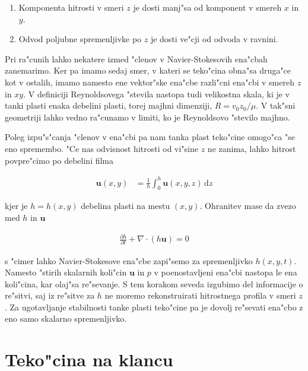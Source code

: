 \documentclass[a4paper,12pt]{article}
\renewcommand{\vec}{\mathbf}
\newcommand{\dd}{\,\mathrm{d}}
\begin{document}
\begin{enumerate}
  \item Komponenta hitrosti v smeri $z$ je dosti manj"sa od komponent v smereh $x$ in $y$. 
  \item Odvod poljubne spremenljivke po $z$ je dosti ve"cji od odvoda v ravnini. 
\end{enumerate}

Pri ra"cunih lahko nekatere izmed "clenov v Navier-Stokesovih ena"cbah zanemarimo. Ker pa imamo sedaj smer, v kateri se teko"cina obna"sa druga"ce kot v ostalih, imamo namesto ene vektor"ske ena"cbe razli"cni ena"cbi v smereh $z$ in $xy$. V definiciji Reynoldsovega "stevila nastopa tudi velikostna skala, ki je v tanki plasti enaka debelini plasti, torej majhni dimenziji, $R = v_0 z_0/\mu$. V tak"sni geometriji lahko vedno ra"cunamo v limiti, ko je Reynoldsovo "stevilo majhno. 

Poleg izpu"s"canja "clenov v ena"cbi pa nam tanka plast teko"cine omogo"ca "se eno spremembo. "Ce nas odvisnost hitrosti od vi"sine $z$ ne zanima, lahko hitrost povpre"cimo po debelini filma

\begin{align}
 \vec u(x,y) &=  \frac{1}{h}\int_0^h \vec u(x,y,z)\dd z
\end{align}

kjer je $h = h(x,y)$ debelina plasti na mestu $(x,y)$. Ohranitev mase da zvezo med $h$ in $\vec u$

\begin{align}
  \frac{\partial h}{\partial t} + \nabla\cdot(h\vec u) = 0
\end{align}

s "cimer lahko Navier-Stokesove ena"cbe zapi"semo za spremenljivko $h(x,y,t)$. Namesto "stirih skalarnih koli"cin $\vec u$ in $p$ v poenostavljeni ena"cbi nastopa le ena koli"cina, kar olaj"sa re"sevanje. S tem korakom seveda izgubimo del informacije o re"sitvi, saj iz re"sitve za $h$ ne moremo rekonstruirati hitrostnega profila v smeri $z$. Za ugotavljanje stabilnosti tanke plasti teko"cine pa je dovolj re"sevati ena"cbo z eno samo skalarno spremenljivko. 

\section{Teko"cina na klancu}
\end{document}
